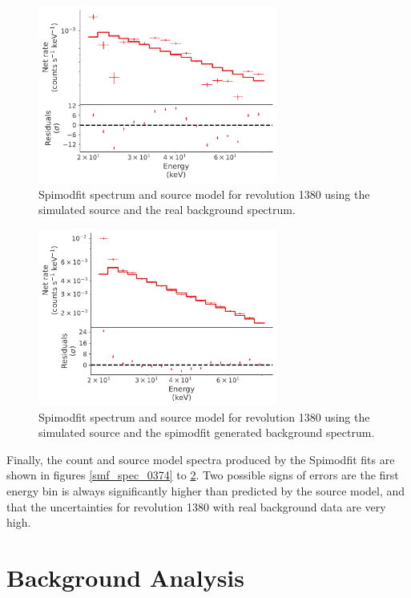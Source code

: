 \documentclass{article}
\begin{document}
\begin{figure}[h]
    \centering
    \includegraphics[width=0.7\textwidth]{Images/smf_spec_1380_sim_source.pdf}
    \caption{Spimodfit spectrum and source model for revolution 1380 using the simulated source and the real background spectrum.}
    \label{smf_spec_1380}
\end{figure}

\begin{figure}[h]
    \centering
    \includegraphics[width=0.7\textwidth]{Images/smf_spec_1380_sim_source_smf_bkg.pdf}
    \caption{Spimodfit spectrum and source model for revolution 1380 using the simulated source and the spimodfit generated background spectrum.}
    \label{smf_spec_1380_smf_bkg}
\end{figure}


Finally, the count and source model spectra produced by the Spimodfit fits are shown in figures \ref{smf_spec_0374} to \ref{smf_spec_1380_smf_bkg}. Two possible signs of errors are the first energy bin is always significantly higher than predicted by the source model, and that the uncertainties for revolution 1380 with real background data are very high.

\section{Background Analysis}
\end{document}
